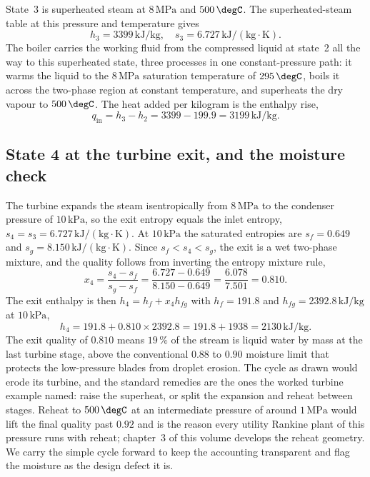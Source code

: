 State~3 is superheated steam at $8\,\text{MPa}$ and $500\,\degC$. The
superheated-steam table at this pressure and temperature gives
\[
h_3 = 3399\,\text{kJ}/\text{kg}, \quad
s_3 = 6.727\,\text{kJ}/(\text{kg}\cdot\si{\kelvin}).
\]
The boiler carries the working fluid from the compressed liquid at
state~2 all the way to this superheated state, three processes in one
constant-pressure path: it warms the liquid to the $8\,\text{MPa}$
saturation temperature of $295\,\degC$, boils it across the two-phase
region at constant temperature, and superheats the dry vapour to
$500\,\degC$. The heat added per kilogram is the enthalpy rise,
\[
q_{\text{in}} = h_3 - h_2 = 3399 - 199.9 = 3199\,\text{kJ}/\text{kg}.
\]

\subsection{State 4 at the turbine exit, and the moisture check}

The turbine expands the steam isentropically from $8\,\text{MPa}$ to the
condenser pressure of $10\,\text{kPa}$, so the exit entropy equals the
inlet entropy, $s_4 = s_3 = 6.727\,\text{kJ}/(\text{kg}\cdot\si{\kelvin})$.
At $10\,\text{kPa}$ the saturated entropies are $s_f = 0.649$ and $s_g =
8.150\,\text{kJ}/(\text{kg}\cdot\si{\kelvin})$. Since $s_f < s_4 < s_g$,
the exit is a wet two-phase mixture, and the quality follows from
inverting the entropy mixture rule,
\[
x_4 = \frac{s_4 - s_f}{s_g - s_f} = \frac{6.727 - 0.649}{8.150 - 0.649} =
\frac{6.078}{7.501} = 0.810.
\]
The exit enthalpy is then $h_4 = h_f + x_4 h_{fg}$ with $h_f = 191.8$ and
$h_{fg} = 2392.8\,\text{kJ}/\text{kg}$ at $10\,\text{kPa}$,
\[
h_4 = 191.8 + 0.810\times 2392.8 = 191.8 + 1938 = 2130\,\text{kJ}/\text{kg}.
\]
The exit quality of $0.810$ means $19\,\%$ of the stream is liquid water
by mass at the last turbine stage, above the conventional $0.88$ to
$0.90$ moisture limit that protects the low-pressure blades from droplet
erosion. The cycle as drawn would erode its turbine, and the standard
remedies are the ones the worked turbine example named: raise the
superheat, or split the expansion and reheat between stages. Reheat to
$500\,\degC$ at an intermediate pressure of around $1\,\text{MPa}$ would
lift the final quality past $0.92$ and is the reason every utility
Rankine plant of this pressure runs with reheat; chapter~3 of this
volume develops the reheat geometry. We carry the simple cycle forward to
keep the accounting transparent and flag the moisture as the design
defect it is.

